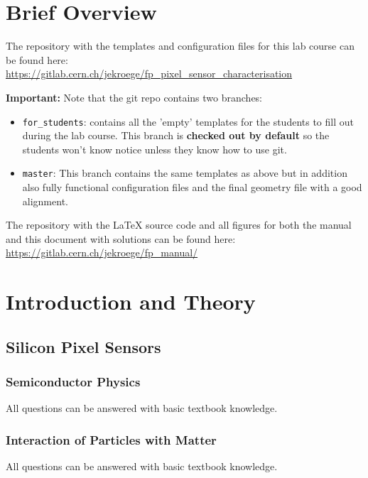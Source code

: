 \documentclass[a4paper,11pt]{article}
\newcommand*{\code}[1]{\texttt{#1}}
\newcounter{temp}
\begin{document}
\section{Brief Overview}
The repository with the templates and configuration files for this lab course can be found here:\\
\url{https://gitlab.cern.ch/jekroege/fp_pixel_sensor_characterisation}

\textbf{Important:} Note that the git repo contains two branches:
\begin{itemize}
\item \code{for\_students}: contains all the 'empty' templates for the students to fill out during the lab course.
This branch is \textbf{checked out by default} so the students won't know notice unless they know how to use git.
\item \code{master}: This branch contains the same templates as above but in addition also fully functional configuration files and the final geometry file with a good alignment.
\end{itemize}

The repository with the LaTeX source code and all figures for both the manual and this document with solutions can be found here:\\
\url{https://gitlab.cern.ch/jekroege/fp_manual/}

\section{Introduction and Theory}

\subsection{Silicon Pixel Sensors}

\subsubsection{Semiconductor Physics}
All questions can be answered with basic textbook knowledge.

\subsubsection{Interaction of Particles with Matter}
All questions can be answered with basic textbook knowledge.
\end{document}
